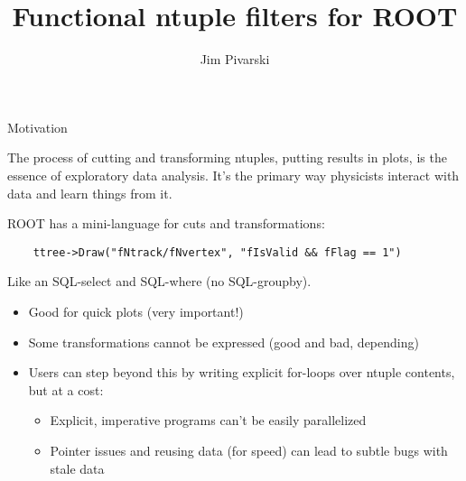 \documentclass{beamer}
\title{Functional ntuple filters for ROOT}
\author{Jim Pivarski}
\begin{document}
\begin{frame}
  \titlepage
\end{frame}

\begin{frame}[fragile]{Motivation}

\begin{block}{}
The process of cutting and transforming ntuples, putting results in plots, is the essence of exploratory data analysis. It's the primary way physicists interact with data and learn things from it.
\end{block}

\begin{block}{}
ROOT has a mini-language for cuts and transformations:
{\scriptsize \begin{verbatim}
    ttree->Draw("fNtrack/fNvertex", "fIsValid && fFlag == 1")
\end{verbatim}}
Like an SQL-select and SQL-where (no SQL-groupby).
\end{block}

\begin{itemize}
\item Good for quick plots (very important!)
\item Some transformations cannot be expressed (good and bad, depending)
\item Users can step beyond this by writing explicit for-loops over ntuple contents, but at a cost:
\begin{itemize}
\item Explicit, imperative programs can't be easily parallelized
\item Pointer issues and reusing data (for speed) can lead to subtle bugs with stale data
\end{itemize}
\end{itemize}
\end{frame}
\end{document}
